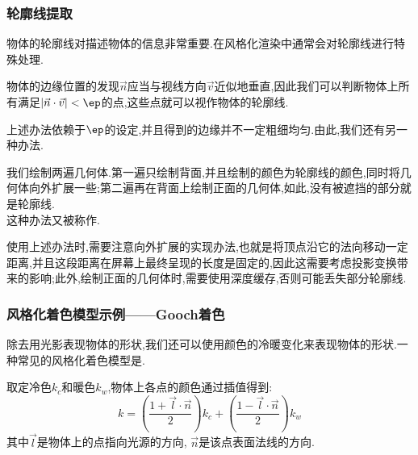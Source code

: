 \documentclass{ctexart}
\begin{document}
\subsubsection{轮廓线提取}
物体的轮廓线对描述物体的信息非常重要.在风格化渲染中通常会对轮廓线进行特殊处理.
\begin{theorem}[轮廓线的提取方法I]
    物体的边缘位置的发现$\vec{n}$应当与视线方向$\vec{v}$近似地垂直,因此我们可以判断物体上所有满足$\left|\vec{n}\cdot\vec{v}\right|<\ep$的点,这些点就可以视作物体的轮廓线.
\end{theorem}
上述办法依赖于$\ep$的设定,并且得到的边缘并不一定粗细均匀.由此,我们还有另一种办法.
\begin{theorem}[轮廓线的提取办法II]
    我们绘制两遍几何体.第一遍只绘制背面,并且绘制的颜色为轮廓线的颜色,同时将几何体向外扩展一些;第二遍再在背面上绘制正面的几何体,如此,没有被遮挡的部分就是轮廓线.\\
    这种办法又被称作.
\end{theorem}
使用上述办法时,需要注意向外扩展的实现办法,也就是将顶点沿它的法向移动一定距离,并且这段距离在屏幕上最终呈现的长度是固定的,因此这需要考虑投影变换带来的影响;此外,绘制正面的几何体时,需要使用深度缓存,否则可能丢失部分轮廓线.
\subsubsection{风格化着色模型示例——Gooch着色}
除去用光影表现物体的形状,我们还可以使用颜色的冷暖变化来表现物体的形状.一种常见的风格化着色模型是.
\begin{definition}[Gooch着色]
    取定冷色$k_{c}$和暖色$k_w$,物体上各点的颜色通过插值得到:
    \[k=\left(\dfrac{1+\vec{l}\cdot\vec{n}}{2}\right)k_c+\left(\dfrac{1-\vec{l}\cdot\vec{n}}{2}\right)k_w\]
    其中$\vec{l}$是物体上的点指向光源的方向, $\vec{n}$是该点表面法线的方向.
\end{definition}
\end{document}
